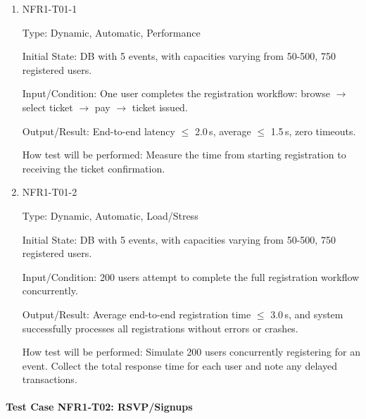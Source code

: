 \documentclass[12pt, titlepage]{article}
\begin{document}
\begin{enumerate}

\item{NFR1-T01-1\\}

Type: Dynamic, Automatic, Performance
					
Initial State: DB with 5 events, with capacities varying from 50-500, 750 registered users.
					
Input/Condition: One user completes the registration workflow: browse $\rightarrow$ select ticket $\rightarrow$ pay $\rightarrow$ ticket issued.
					
Output/Result:  End-to-end latency $\leq$ 2.0\,s, average $\leq$ 1.5\,s, zero timeouts.
					
How test will be performed: Measure the time from starting registration to receiving the ticket confirmation.

\item{NFR1-T01-2\\}

Type: Dynamic, Automatic, Load/Stress
					
Initial State: DB with 5 events, with capacities varying from 50-500, 750 registered users.
					
Input/Condition: 200 users attempt to complete the full registration workflow concurrently.
					
Output/Result: Average end-to-end registration time $\leq$ 3.0\,s, and system successfully processes all registrations without errors or crashes.  
					
How test will be performed: Simulate 200 users concurrently registering for an event. Collect the total response time for each user and note any delayed transactions.
\end{enumerate}

\paragraph{Test Case NFR1-T02: RSVP/Signups}
\end{document}
